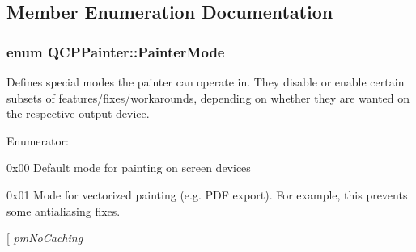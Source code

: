 \subsection{\-Member \-Enumeration \-Documentation}
\hypertarget{classQCPPainter_a156cf16444ff5e0d81a73c615fdb156d}{
\subsubsection[{\-Painter\-Mode}]{\setlength{\rightskip}{0pt plus 5cm}enum {\bf \-Q\-C\-P\-Painter\-::\-Painter\-Mode}}}\label{classQCPPainter_a156cf16444ff5e0d81a73c615fdb156d}
\-Defines special modes the painter can operate in. \-They disable or enable certain subsets of features/fixes/workarounds, depending on whether they are wanted on the respective output device. \begin{Desc}
\item[\-Enumerator\-: ]\par
\begin{description}
\item[{\em 
\hypertarget{classQCPPainter_a156cf16444ff5e0d81a73c615fdb156da3bac5e87e3d58553b297befb4eee2a45}{pm\-Default}\label{classQCPPainter_a156cf16444ff5e0d81a73c615fdb156da3bac5e87e3d58553b297befb4eee2a45}
}]{\ttfamily 0x00} \-Default mode for painting on screen devices \item[{\em 
\hypertarget{classQCPPainter_a156cf16444ff5e0d81a73c615fdb156daeda679cd55dcd468341d07d48a30b6ab}{pm\-Vectorized}\label{classQCPPainter_a156cf16444ff5e0d81a73c615fdb156daeda679cd55dcd468341d07d48a30b6ab}
}]{\ttfamily 0x01} \-Mode for vectorized painting (e.\-g. \-P\-D\-F export). \-For example, this prevents some antialiasing fixes. \item[{\em 
\hypertarget{classQCPPainter_a156cf16444ff5e0d81a73c615fdb156dae78f9a4eb277a5f9207f50850a51a0b0}{pm\-No\-Caching}\label{classQCPPainter_a156cf16444ff5e0d81a73c615fdb156dae78f9a4eb277a5f9207f50850a51a0b0}
}
\end{description}
\end{Desc}
